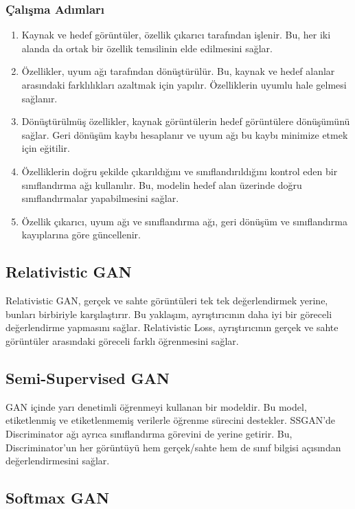 \subsubsection{Çalışma Adımları}

\begin{enumerate}
    \item Kaynak ve hedef görüntüler, özellik çıkarıcı tarafından işlenir. Bu, her iki alanda da ortak bir özellik temsilinin elde edilmesini sağlar.
    \item Özellikler, uyum ağı tarafından dönüştürülür. Bu, kaynak ve hedef alanlar arasındaki farklılıkları azaltmak için yapılır. Özelliklerin uyumlu hale gelmesi sağlanır.
    \item Dönüştürülmüş özellikler, kaynak görüntülerin hedef görüntülere dönüşümünü sağlar. Geri dönüşüm kaybı hesaplanır ve uyum ağı bu kaybı minimize etmek için eğitilir.
    \item Özelliklerin doğru şekilde çıkarıldığını ve sınıflandırıldığını kontrol eden bir sınıflandırma ağı kullanılır. Bu, modelin hedef alan üzerinde doğru sınıflandırmalar yapabilmesini sağlar.
    \item Özellik çıkarıcı, uyum ağı ve sınıflandırma ağı, geri dönüşüm ve sınıflandırma kayıplarına göre güncellenir.
\end{enumerate}

\subsection{Relativistic GAN}

Relativistic GAN, gerçek ve sahte görüntüleri tek tek değerlendirmek yerine, bunları birbiriyle karşılaştırır. Bu yaklaşım, ayrıştırıcının daha iyi bir göreceli değerlendirme yapmasını sağlar. Relativistic Loss, ayrıştırıcının gerçek ve sahte görüntüler arasındaki göreceli farklı öğrenmesini sağlar.

\subsection{Semi-Supervised GAN}

GAN içinde yarı denetimli öğrenmeyi kullanan bir modeldir. Bu model, etiketlenmiş ve etiketlenmemiş verilerle öğrenme sürecini destekler. SSGAN'de Discriminator ağı ayrıca sınıflandırma görevini de yerine getirir. Bu, Discriminator'un her görüntüyü hem gerçek/sahte hem de sınıf bilgisi açısından değerlendirmesini sağlar.

\subsection{Softmax GAN}

